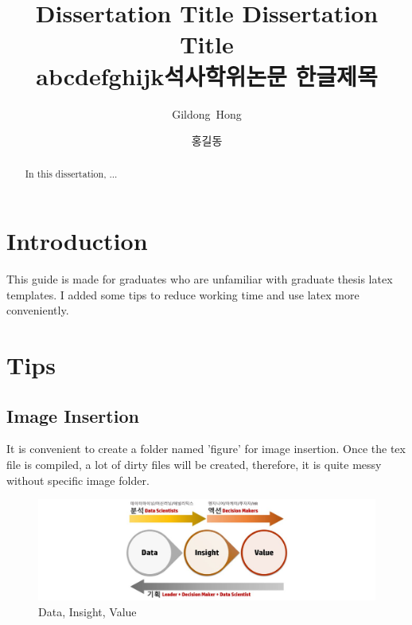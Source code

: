 \documentclass[twoside,ms]{snuthesis_utf8}
\title{Dissertation Title Dissertation Title \\abcdefghijk}
\title*{석사학위논문 한글제목}
\author{Gildong~Hong}
\author*{홍길동} %
\begin{document}
\makefrontcover
\makeapproval


\cleardoublepage
{}

\begin{abstract}
In this dissertation, ...

\end{abstract}
\cleardoublepage

\tableofcontents
{}
\cleardoublepage

\listoftables
{}
\cleardoublepage

\listoffigures
{}
\cleardoublepage


\chapter{Introduction}

This guide is made for graduates who are unfamiliar with graduate thesis latex templates.
I added some tips to reduce working time and use latex more conveniently.

\clearpage
\chapter{Tips}
\section{Image Insertion}
It is convenient to create a folder named 'figure' for image insertion.
Once the tex file is compiled, a lot of dirty files will be created, therefore, it is quite messy without specific image folder.


\begin{figure}[h]
	\centering
	\includegraphics[width=1\textwidth]{figure/div.png}  %
	\caption{Data, Insight, Value}
	\label{fig:div}
\end{figure}
\end{document}
